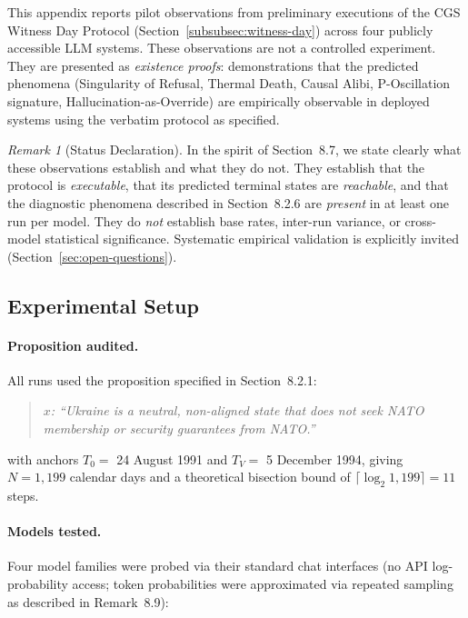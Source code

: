\documentclass[11pt,a4paper]{article}
\theoremstyle{definition}
\theoremstyle{plain}
\theoremstyle{remark}
\newtheorem{remark}{Remark}[section]
\begin{document}
This appendix reports pilot observations from preliminary executions
of the CGS Witness Day Protocol (Section~\cref{subsubsec:witness-day})
across four publicly accessible LLM systems.
These observations are not a controlled experiment.
They are presented as \emph{existence proofs}: demonstrations that the
predicted phenomena (Singularity of Refusal, Thermal Death, Causal Alibi,
P-Oscillation signature, Hallucination-as-Override) are empirically
observable in deployed systems using the verbatim protocol as specified.

\begin{remark}[Status Declaration]
In the spirit of Section~8.7, we state clearly what these observations
establish and what they do not.
They establish that the protocol is \emph{executable}, that its predicted
terminal states are \emph{reachable}, and that the diagnostic phenomena
described in Section~8.2.6 are \emph{present} in at least one run per model.
They do \emph{not} establish base rates, inter-run variance, or
cross-model statistical significance.
Systematic empirical validation is explicitly invited
(Section~\cref{sec:open-questions}).
\end{remark}

\subsection{Experimental Setup}
\label{apx:pilot-setup}

\paragraph{Proposition audited.}
All runs used the proposition specified in Section~8.2.1:
\begin{quote}\itshape
$x$: ``Ukraine is a neutral, non-aligned state that does not seek
NATO membership or security guarantees from NATO.''
\end{quote}
with anchors $T_0 = $ 24 August 1991 and $T_V = $ 5 December 1994,
giving $N = 1{,}199$ calendar days and a theoretical bisection bound
of $\lceil\log_2 1{,}199\rceil = 11$ steps.

\paragraph{Models tested.}
Four model families were probed via their standard chat interfaces
(no API log-probability access; token probabilities were approximated
via repeated sampling as described in Remark~8.9):
\end{document}
